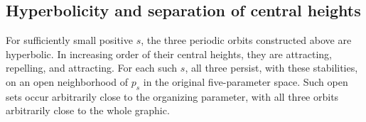 \subsection{Hyperbolicity and separation of central heights}

\begin{corollary}
\label{cor:hyperbolic-triple}
For sufficiently small positive \(s\), the three periodic
orbits constructed above are hyperbolic. In increasing order
of their central heights, they are attracting, repelling, and
attracting. For each such \(s\), all three persist, with these
stabilities, on an open neighborhood of \(p_s\) in the original
five-parameter space. Such open sets occur arbitrarily close
to the organizing parameter, with all three orbits arbitrarily
close to the whole graphic.
\end{corollary}

